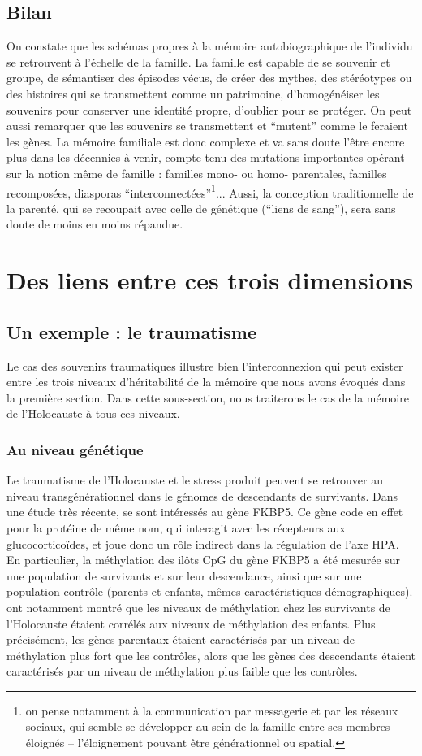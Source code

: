 \documentclass[french]{article}
\begin{document}
	
		\subsection{Bilan}
			On constate que les schémas propres à la mémoire autobiographique de l'individu se retrouvent à l'échelle de la famille. La famille est capable de se souvenir et groupe, de sémantiser des épisodes vécus, de créer des mythes, des stéréotypes ou des histoires qui se transmettent comme un patrimoine, d'homogénéiser les souvenirs pour conserver une identité propre, d'oublier pour se protéger. On peut aussi remarquer que les souvenirs se transmettent et ``mutent'' comme le feraient les gènes. La mémoire familiale est donc complexe et va sans doute l'être encore plus dans les décennies à venir, compte tenu des mutations importantes opérant sur la notion même de famille : familles mono- ou homo- parentales, familles recomposées, diasporas ``interconnectées''\footnote{on pense notamment à la communication par messagerie et par les réseaux sociaux, qui semble se développer au sein de la famille entre ses membres éloignés -- l'éloignement pouvant être générationnel ou spatial.}... Aussi, la conception traditionnelle de la parenté, qui se recoupait avec celle de génétique (``liens de sang''), sera sans doute de moins en moins répandue.
		
	\section{Des liens entre ces trois dimensions}\label{liens}
		\subsection{Un exemple : le traumatisme}
			Le cas des souvenirs traumatiques illustre bien l'interconnexion qui peut exister entre les trois niveaux d'héritabilité de la mémoire que nous avons évoqués dans la première section. Dans cette sous-section, nous traiterons le cas de la mémoire de l'Holocauste à tous ces niveaux.
			\subsubsection{Au niveau génétique}
				Le traumatisme de l'Holocauste et le stress produit peuvent se retrouver au niveau transgénérationnel dans le génomes de descendants de survivants. Dans une étude très récente, \cite{yehuda2016} se sont intéressés au gène FKBP5. Ce gène code en effet pour la protéine de même nom, qui interagit avec les récepteurs aux glucocorticoïdes, et joue donc un rôle indirect dans la régulation de l'axe HPA. En particulier, la méthylation des ilôts CpG du gène FKBP5 a été mesurée sur une population de survivants et sur leur descendance, ainsi que sur une population contrôle (parents et enfants, mêmes caractéristiques démographiques). \cite{yehuda2016} ont notamment montré que les niveaux de méthylation chez les survivants de l'Holocauste étaient corrélés aux niveaux de méthylation des enfants. Plus précisément, les gènes parentaux étaient caractérisés par un niveau de méthylation plus fort que les contrôles, alors que les gènes des descendants étaient caractérisés par un niveau de méthylation plus faible que les contrôles.\\
				
\end{document}
